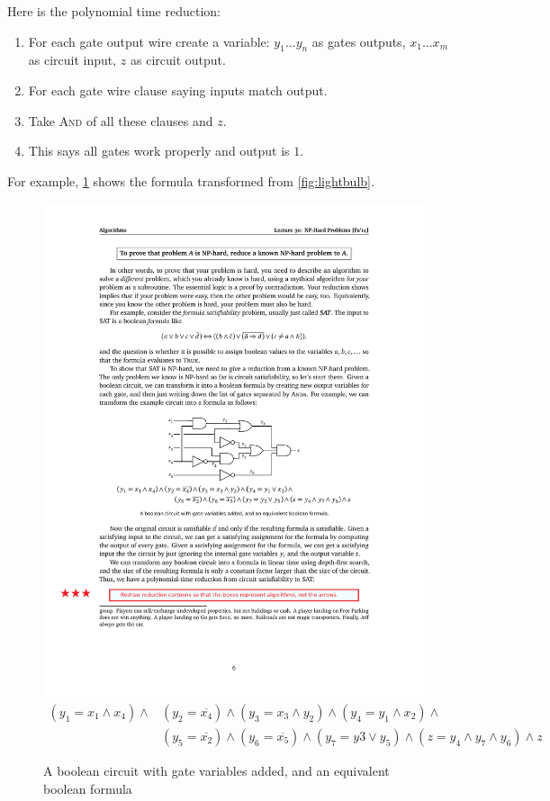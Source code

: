 Here is the polynomial time reduction:
\begin{enumerate}
    \item For each gate output wire create a variable: $y_1 \ldots y_n$ as gates outputs,
        $x_1 \ldots x_m$ as circuit input, $z$ as circuit output.
    \item For each gate wire clause saying inputs match output.
    \item Take \textsc{And} of all these clauses and $z$.
    \item This says all gates work properly and output is $1$.
\end{enumerate}
For example, \cref{fig:sat} shows the formula transformed from \cref{fig:lightbulb}.
\begin{figure}[H]
    \centering
    \includegraphics[scale=1.25]{fig/sat}
\begin{align*}
    (y_1 = x_1 \land x_4)\land&(y_2 = \overline{x_4})\land(y_3 = x_3 \land y_2)\land(y_4 = y_1 \land x_2)\land\\
    &(y_5 = \overline{x_2})\land(y_6 = \overline{x_5})\land(y_7 = y3 \lor y_5)\land(z = y_4 \land y_7 \land y_6) \land z
\end{align*}
    \caption{A boolean circuit with gate variables added, and an equivalent boolean formula}
    \label{fig:sat}
\end{figure}

